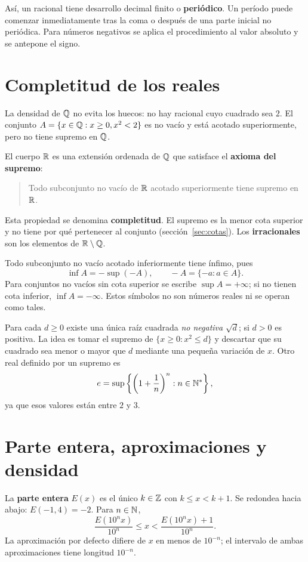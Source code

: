 Así, un racional tiene desarrollo decimal finito o \textbf{periódico}.
Un período puede comenzar inmediatamente tras la coma o después de una
parte inicial no periódica. Para números negativos se aplica el
procedimiento al valor absoluto y se antepone el signo.

\section{Completitud de los reales}
\label{sec:completitud}
La densidad de $\mathbb{Q}$ no evita los huecos: no hay racional cuyo cuadrado
sea $2$. El conjunto
$A=\{x\in\mathbb{Q}:x\ge0, x^2<2\}$ es no vacío y está acotado superiormente,
pero no tiene supremo en $\mathbb{Q}$.

El cuerpo $\mathbb{R}$ es una extensión ordenada de $\mathbb{Q}$ que satisface el
\textbf{axioma del supremo}:
\begin{quote}
Todo subconjunto no vacío de $\mathbb{R}$ acotado superiormente tiene supremo en $\mathbb{R}$.
\end{quote}
Esta propiedad se denomina \textbf{completitud}. El supremo es la menor
cota superior y no tiene por qué pertenecer al conjunto
(sección~\ref{sec:cotas}). Los \textbf{irracionales} son los elementos
de $\mathbb{R}\setminus\mathbb{Q}$.

Todo subconjunto no vacío acotado inferiormente tiene ínfimo, pues
\[
 \inf A=-\sup(-A),\qquad -A=\{-a:a\in A\}.
\]
Para conjuntos no vacíos sin cota superior se escribe $\sup A=+\infty$;
si no tienen cota inferior, $\inf A=-\infty$. Estos símbolos no son
números reales ni se operan como tales.

Para cada $d\ge0$ existe una única raíz cuadrada \emph{no negativa}
$\sqrt d$; si $d>0$ es positiva. La idea es tomar el supremo de
$\{x\ge0:x^2\le d\}$ y descartar que su cuadrado sea menor o mayor que
$d$ mediante una pequeña variación de $x$.
Otro real definido por un supremo es
\[
 e=\sup\left\{\left(1+\frac1n\right)^n:n\in\mathbb{N}^*\right\},
\]
ya que esos valores están entre $2$ y $3$.

\section{Parte entera, aproximaciones y densidad}
\label{sec:aproximaciones-reales}
La \textbf{parte entera} $E(x)$ es el único $k\in\mathbb{Z}$ con
$k\le x<k+1$. Se redondea hacia abajo: $E(-1{,}4)=-2$.
Para $n\in\mathbb{N}$,
\[
 \frac{E(10^nx)}{10^n}\le x<\frac{E(10^nx)+1}{10^n}.
\]
La aproximación por defecto difiere de $x$ en menos de $10^{-n}$;
el intervalo de ambas aproximaciones tiene longitud $10^{-n}$.

